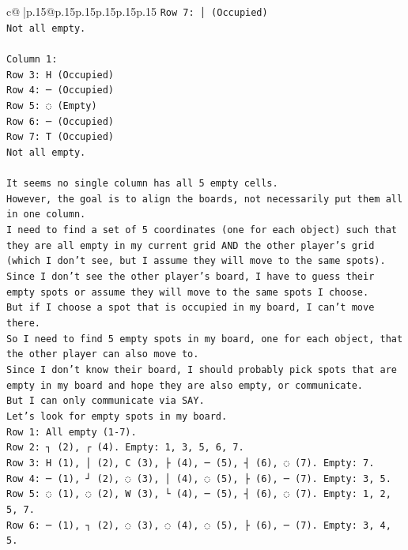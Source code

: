 \documentclass{article}
\begin{document}
{\begin{supertabular}{c@{$\;$}|p{.15\linewidth}@{}p{.15\linewidth}p{.15\linewidth}p{.15\linewidth}p{.15\linewidth}p{.15\linewidth}}
{{{\texttt{Row 7: │ (Occupied)} \\
\texttt{Not all empty.} \\
\\ 
\texttt{Column 1:} \\
\texttt{Row 3: H (Occupied)} \\
\texttt{Row 4: ─ (Occupied)} \\
\texttt{Row 5: ◌ (Empty)} \\
\texttt{Row 6: ─ (Occupied)} \\
\texttt{Row 7: T (Occupied)} \\
\texttt{Not all empty.} \\
\\ 
\texttt{It seems no single column has all 5 empty cells.} \\
\texttt{However, the goal is to align the boards, not necessarily put them all in one column.} \\
\texttt{I need to find a set of 5 coordinates (one for each object) such that they are all empty in my current grid AND the other player's grid (which I don't see, but I assume they will move to the same spots).} \\
\texttt{Since I don't see the other player's board, I have to guess their empty spots or assume they will move to the same spots I choose.} \\
\texttt{But if I choose a spot that is occupied in my board, I can't move there.} \\
\texttt{So I need to find 5 empty spots in my board, one for each object, that the other player can also move to.} \\
\texttt{Since I don't know their board, I should probably pick spots that are empty in my board and hope they are also empty, or communicate.} \\
\texttt{But I can only communicate via SAY.} \\
\texttt{Let's look for empty spots in my board.} \\
\texttt{Row 1: All empty (1{-}7).} \\
\texttt{Row 2: ┐ (2), ┌ (4). Empty: 1, 3, 5, 6, 7.} \\
\texttt{Row 3: H (1), │ (2), C (3), ├ (4), ─ (5), ┤ (6), ◌ (7). Empty: 7.} \\
\texttt{Row 4: ─ (1), ┘ (2), ◌ (3), │ (4), ◌ (5), ├ (6), ─ (7). Empty: 3, 5.} \\
\texttt{Row 5: ◌ (1), ◌ (2), W (3), └ (4), ─ (5), ┤ (6), ◌ (7). Empty: 1, 2, 5, 7.} \\
\texttt{Row 6: ─ (1), ┐ (2), ◌ (3), ◌ (4), ◌ (5), ├ (6), ─ (7). Empty: 3, 4, 5.} \\
}}}
\end{supertabular}}
\end{document}
